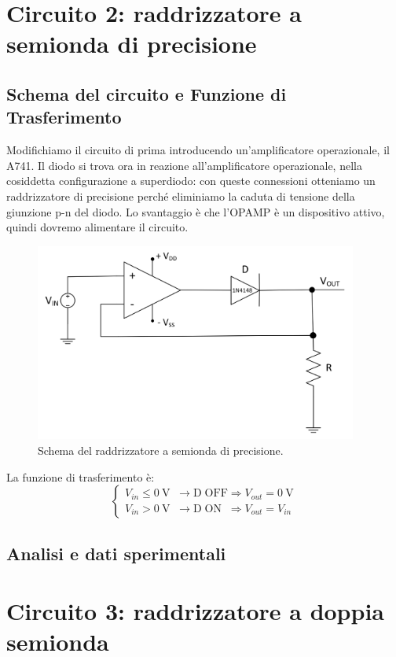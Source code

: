 \documentclass{report}
\begin{document}
\section{Circuito 2: raddrizzatore a semionda di precisione}
\subsection{Schema del circuito e Funzione di Trasferimento}
Modifichiamo il circuito di prima introducendo un'amplificatore operazionale, il \textmu A741. Il diodo si trova ora in reazione all'amplificatore operazionale, nella cosiddetta configurazione a superdiodo: con queste connessioni otteniamo un raddrizzatore di precisione perché eliminiamo la caduta di tensione della giunzione p-n del diodo. Lo svantaggio è che l'OPAMP è un dispositivo attivo, quindi dovremo alimentare il circuito.\par
\begin{figure}[h]
	\centering
	\includegraphics[height=6.5cm]{immagini/schema2}
	\caption{Schema del raddrizzatore a semionda di precisione.}
	\label{figura:schema2}
\end{figure}
\noindent La funzione di trasferimento è:
\begin{equation}
   \begin{cases}
   V_{in}\le \SI{0}{\volt}\;\;\rightarrow \mathrm{D\;OFF} \Rightarrow V_{out} =\SI{0}{\volt}\\
   V_{in}> \SI{0}{\volt}\;\;\rightarrow \mathrm{D\;ON}\;\; \Rightarrow V_{out} = V_{in}
   \end{cases}
\end{equation}
\subsection{Analisi e dati sperimentali}

\newpage
\section{Circuito 3: raddrizzatore a doppia semionda}
\end{document}
